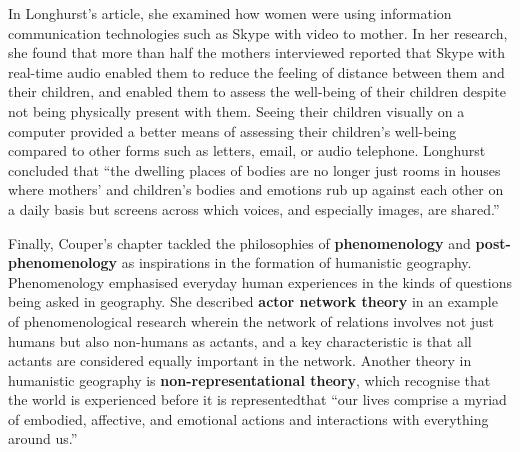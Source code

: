 \documentclass[a4paper, 10.5pt]{article} %
\begin{document}
In Longhurst's article, she examined how women were using information communication technologies such as Skype with video to mother. In her research, she found that more than half the mothers interviewed reported that Skype with real-time audio enabled them to reduce the feeling of distance between them and their children, and enabled them to assess the well-being of their children despite not being physically present with them. Seeing their children visually on a computer provided a better means of assessing their children's well-being compared to other forms such as letters, email, or audio telephone. Longhurst concluded that \enquote{the dwelling places of bodies are no longer just rooms in houses where mothers' and children's bodies and emotions rub up against each other on a daily basis but screens across which voices, and especially images, are shared.}

Finally, Couper's chapter tackled the philosophies of \textbf{phenomenology} and \textbf{post-phenomenology} as inspirations in the formation of humanistic geography. Phenomenology emphasised everyday human experiences in the kinds of questions being asked in geography. She described \textbf{actor network theory} in an example of phenomenological research wherein the network of relations involves not just humans but also non-humans as actants, and a key characteristic is that all actants are considered equally important in the network. Another theory in humanistic geography is \textbf{non-representational theory}, which recognise that the world is experienced before it is represented\textemdash{}that \enquote{our lives comprise a myriad of embodied, affective, and emotional actions and interactions with everything around us.}





\end{document}
